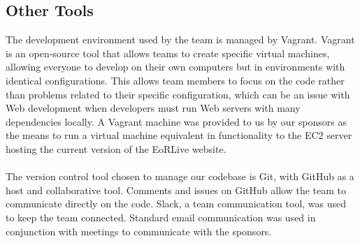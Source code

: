 \documentclass[12pt]{article}
\begin{document}
\begin{spacing}{1.5}
\subsection{Other Tools}
The development environment used by the team is managed by Vagrant. Vagrant is an open-source tool that allows teams to create specific virtual machines, allowing everyone to develop on their own computers but in environments with identical configurations. This allows team members to focus on the code rather than problems related to their specific configuration, which can be an issue with Web development when developers must run Web servers with many dependencies locally.  A Vagrant machine was provided to us by our sponsors as the means to run a virtual machine equivalent in functionality to the EC2 server hosting the current version of the EoRLive website.
\\ \\
The version control tool chosen to manage our codebase is Git, with GitHub as a host and collaborative tool. Comments and issues on GitHub allow the team to communicate directly on the code. Slack, a team communication tool, was used to keep the team connected. Standard email communication was used in conjunction with meetings to communicate with the sponsors.


\end{spacing}
\end{document}
